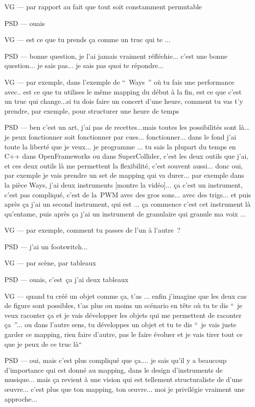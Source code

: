 VG — par rapport au fait que tout soit constamment permutable 

PSD — ouais 

VG — est ce que tu prends ça comme un truc qui te ... 

PSD — bonne question, je l'ai jamais vraiment réfléchie... c'est une bonne question... je sais pas... je sais pas quoi te répondre... 

VG — par exemple, dans l'exemple de “ Ways ” où tu fais une performance avec.. est ce que tu utilises le même mapping du début à la fin, est ce que c'est un truc qui change...si tu dois faire un concert d'une heure, comment tu vas t'y prendre,  par exemple, pour structurer une heure de temps  

PSD — ben c'est un art, j'ai pas de recettes...mais toutes les possibilités sont là... je peux fonctionner soit fonctionner par cues... fonctionner... dans le fond j'ai toute la liberté que je veux... je programme ... tu sais la plupart du temps en C++ dans OpenFrameworks ou dans SuperCollider, c'est les deux outils que j'ai, et ces deux outils là me permettent la flexibilité, c'est souvent aussi... donc oui, par exemple je vais prendre un set de mapping qui va durer... par exemple dans la pièce Ways, j'ai deux instruments [montre la vidéo]... ça c'est un instrument, c'est pas compliqué, c'est de la PWM avec des gros sons... avec des trigs... et puis après ça j'ai un second instrument, qui est ... ça commence c'est cet instrument là qu'entame, puis après ça j'ai un instrument de granulaire qui granule ma voix ... 

VG — par exemple, comment tu passes de l'un à l'autre ? 

PSD — j'ai un footswitch... 

VG — par scène, par tableaux 

PSD — ouais, c'est ça j'ai deux tableaux 

VG — quand tu créé un objet comme ça, t'as ... enfin j'imagine que les deux cas de figure sont possibles, t'as plus ou moins un scénario en tête où tu te dis “ je veux raconter ça et je vais développer les objets qui me permettent de raconter ça ”... ou dans l'autre sens, tu développes un objet et tu te dis “ je vais juste garder ce mapping, rien faire d'autre, pas le faire évoluer et je vais tirer tout ce que je peux de ce truc là“  

PSD — oui, mais c'est plus compliqué que ça.... je sais qu'il y a beaucoup d'importance qui est donné au mapping, dans le design d'instruments de musique... mais ça revient à une vision qui est tellement structuraliste de d'une œuvre... c'est plus que ton mapping, ton œuvre... moi je privilégie vraiment une approche... 

